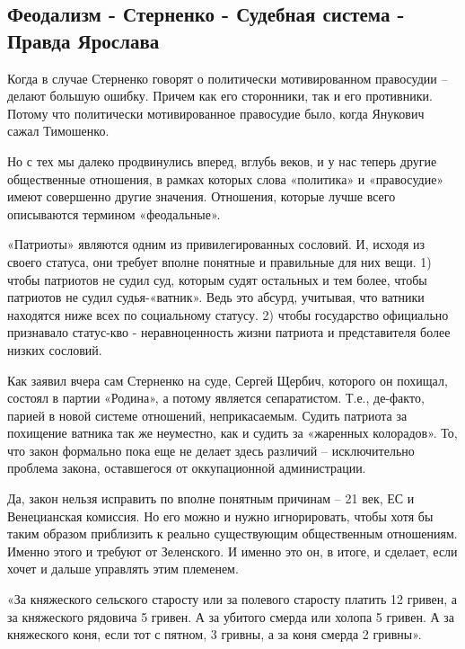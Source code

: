  
 
 
 
 

\subsection{Феодализм - Стерненко - Судебная система - Правда Ярослава}
\label{sec:10_04_2021.fb.chechilo_vyacheslav.1.sternenko_ruspravda_feodalizm}

Когда в случае Стерненко говорят о политически мотивированном правосудии –
делают большую ошибку. Причем как его сторонники, так и его противники. Потому
что политически мотивированное правосудие было, когда Янукович сажал Тимошенко.

Но с тех мы далеко продвинулись вперед, вглубь веков, и у нас теперь другие
общественные отношения, в рамках которых слова «политика» и «правосудие» имеют
совершенно другие значения. Отношения, которые лучше всего описываются термином
«феодальные».

«Патриоты» являются одним из привилегированных сословий. И, исходя из своего
статуса, они требует вполне понятные и правильные для них вещи. 1) чтобы
патриотов не судил суд, которым судят остальных и тем более, чтобы патриотов не
судил судья-«ватник». Ведь это абсурд, учитывая, что ватники находятся ниже
всех по социальному статусу.  2) чтобы государство официально признавало
статус-кво - неравноценность жизни патриота и представителя более низких
сословий.

Как заявил вчера сам Стерненко на суде, Сергей Щербич, которого он похищал,
состоял в партии «Родина», а потому является сепаратистом. Т.е., де-факто,
парией в новой системе отношений, неприкасаемым. Судить патриота за похищение
ватника так же неуместно, как и судить за «жаренных колорадов». То, что закон
формально пока еще не делает здесь различий – исключительно проблема закона,
оставшегося от оккупационной администрации.

Да, закон нельзя исправить по вполне понятным причинам – 21 век, ЕС и
Венецианская комиссия. Но его можно и нужно игнорировать, чтобы хотя бы таким
образом приблизить к реально существующим общественным отношениям. Именно этого
и требуют от Зеленского. И именно это он, в итоге, и сделает, если хочет и
дальше управлять этим племенем.

«За княжеского сельского старосту или за полевого старосту платить 12 гривен, а
за княжеского рядовича 5 гривен. А за убитого смерда или холопа 5 гривен. А за
княжеского коня, если тот с пятном, 3 гривны, а за коня смерда 2 гривны».
